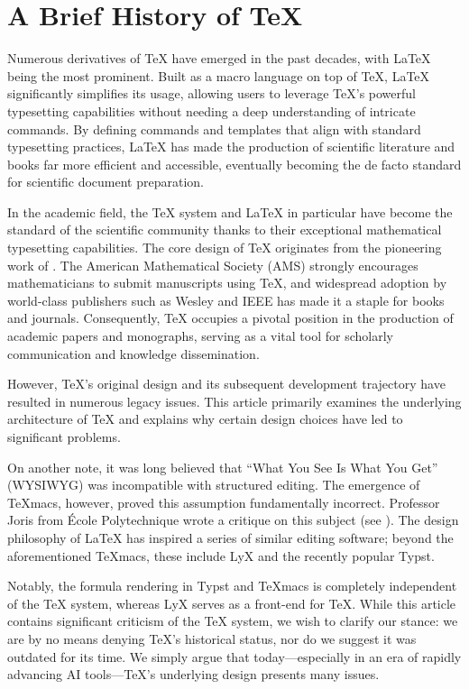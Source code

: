 \section{A Brief History of \TeX}
\label{app:intro}

Numerous derivatives of \TeX{} have emerged in the past decades, with \LaTeX{} being the most prominent. Built as a macro language on top of \TeX{}, \LaTeX{} significantly simplifies its usage, allowing users to leverage \TeX{}'s powerful typesetting capabilities without needing a deep understanding of intricate commands. By defining commands and templates that align with standard typesetting practices, \LaTeX{} has made the production of scientific literature and books far more efficient and accessible, eventually becoming the de facto standard for scientific document preparation.

In the academic field, the \TeX{} system and \LaTeX{} in particular have become the standard of the scientific community thanks to their exceptional mathematical typesetting capabilities. The core design of \TeX{} originates from the pioneering work of \citet{knuth1984texbook}. The American Mathematical Society (AMS) strongly encourages mathematicians to submit manuscripts using \TeX{}, and widespread adoption by world-class publishers such as Wesley and IEEE has made it a staple for books and journals. Consequently, \TeX{} occupies a pivotal position in the production of academic papers and monographs, serving as a vital tool for scholarly communication and knowledge dissemination.

However, \TeX{}'s original design and its subsequent development trajectory have resulted in numerous legacy issues. This article primarily examines the underlying architecture of \TeX{} and explains why certain design choices have led to significant problems.

On another note, it was long believed that ``What You See Is What You Get'' (WYSIWYG) was incompatible with structured editing. The emergence of \TeX{}macs, however, proved this assumption fundamentally incorrect. Professor Joris from \'Ecole Polytechnique wrote a critique on this subject (see \citealp{van_der_hoeven_gnu_2001, liiistem2025}). The design philosophy of \LaTeX{} has inspired a series of similar editing software; beyond the aforementioned \TeX{}macs, these include LyX and the recently popular Typst.

Notably, the formula rendering in Typst and \TeX{}macs is completely independent of the \TeX{} system, whereas LyX serves as a front-end for \TeX{}. While this article contains significant criticism of the \TeX{} system, we wish to clarify our stance: we are by no means denying \TeX{}'s historical status, nor do we suggest it was outdated for its time. We simply argue that today---especially in an era of rapidly advancing AI tools---\TeX{}'s underlying design presents many issues.

